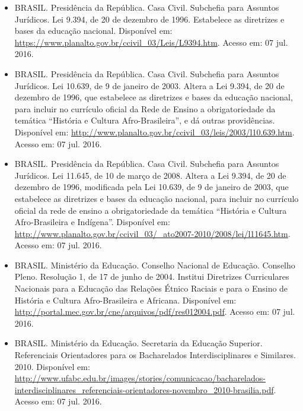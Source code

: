 \begin{itemize}
    
    \item BRASIL. Presidência da República. Casa Civil. Subchefia para Assuntos
    Jurídicos. Lei 9.394, de 20 de dezembro de 1996. Estabelece as diretrizes e
    bases da educação nacional. Disponível em:
    \url{https://www.planalto.gov.br/ccivil_03/Leis/L9394.htm}. Acesso em: 07
    jul. 2016.
    
    \item BRASIL. Presidência da República. Casa Civil. Subchefia para Assuntos
    Jurídicos. Lei 10.639, de 9 de janeiro de 2003. Altera a Lei 9.394, de 20
    de dezembro de 1996, que estabelece as diretrizes e bases da educação
    nacional, para incluir no currículo oficial da Rede de Ensino a
    obrigatoriedade da temática ``História e Cultura Afro-Brasileira'', e dá
    outras providências. Disponível em:
    \url{http://www.planalto.gov.br/ccivil_03/leis/2003/l10.639.htm}. Acesso
    em: 07 jul. 2016.
    
    \item BRASIL. Presidência da República. Casa Civil. Subchefia para Assuntos
    Jurídicos. Lei 11.645, de 10 de março de 2008. Altera a Lei 9.394, de 20 de
    dezembro de 1996, modificada pela Lei 10.639, de 9 de janeiro de 2003, que
    estabelece as diretrizes e bases da educação nacional, para incluir no
    currículo oficial da rede de ensino a obrigatoriedade da temática
    ``História e Cultura Afro-Brasileira e Indígena''. Disponível em:
    \url{http://www.planalto.gov.br/ccivil_03/_ato2007-2010/2008/lei/l11645.htm}.
    Acesso em: 07 jul. 2016.
    
    \item BRASIL. Ministério da Educação. Conselho Nacional de Educação.
    Conselho Pleno. Resolução 1, de 17 de junho de 2004. Institui Diretrizes
    Curriculares Nacionais para a Educação das Relações Étnico Raciais e para o
    Ensino de História e Cultura Afro-Brasileira e Africana. Disponível em:
    \url{http://portal.mec.gov.br/cne/arquivos/pdf/res012004.pdf}. Acesso em:
    07 jul. 2016.
    
    \item BRASIL. Ministério da Educação. Secretaria da Educação Superior.
    Referenciais Orientadores para os Bacharelados Interdisciplinares e
    Similares. 2010. Disponível em:
    \url{http://www.ufabc.edu.br/images/stories/comunicacao/bacharelados-interdisciplinares_referenciais-orientadores-novembro_2010-brasilia.pdf}.
    Acesso em: 07 jul. 2016.
    

\end{itemize}
